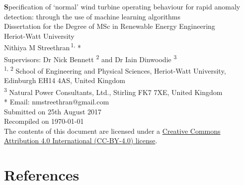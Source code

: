 \documentclass[twoside,11pt,openany]{book}
\title{\textbf\documenttitle}
\author{\authorname}
\def\documenttitle{Specification of \texorpdfstring{`}{'}normal' wind turbine
  operating behaviour for rapid anomaly detection: through the use of machine
  learning algorithms}
\def\authorname{Nithiya M Streethran}
\def\documentdate{25th August 2017}
\def\programme{MSc in Renewable Energy Engineering}
\begin{document}
  \frontmatter
  \begin{titlepage}
    \hspace{0pt} %
    \vfill %
    \centering %
    \huge\textbf\documenttitle
    \\[2cm]
    \Large Dissertation for the Degree of \programme
    \\
    Heriot-Watt University
    \\[2cm]
    \authorname \textsuperscript{\,1, }*
    \\[.3cm]
    Supervisors: Dr Nick Bennett \textsuperscript{2} and
    Dr Iain Dinwoodie \textsuperscript{3}
    \\[.3cm]
    \large
    \textsuperscript{1, 2} School of Engineering and Physical Sciences,
    Heriot-Watt University, Edinburgh EH14 4AS, United Kingdom
    \\[.1cm]
    \textsuperscript{3} Natural Power Consultants, Ltd.,
    Stirling FK7 7XE, United Kingdom
    \\[.3cm]
    * Email: nmstreethran@gmail.com
    \\[2cm]
    \Large
    Submitted on \documentdate
    \\[.3cm]
    Recompiled on \today
    \\[2cm]
    The contents of this document are licensed under a
    \href{https://creativecommons.org/licenses/by/4.0/}
    {Creative Commons Attribution 4.0 International (CC-BY-4.0) license}.
    \vfill %
    \hspace{0pt} %
  \end{titlepage}
  
  \tableofcontents
  \listoffigures
  \listoftables

  \mainmatter
  
  
  
  
  

  {
    \backmatter
    

    \chapter{References}
    \begingroup
    \relax
    \printbibliography[heading=none]
    \endgroup
  }

  \appendix
  
\end{document}
